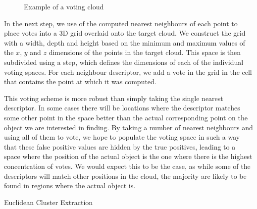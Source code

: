 \documentclass[11pt,a4paper]{kth-mag}
\begin{document}
\begin{figure}
  \centering
  
  \caption{Example of a voting cloud}
  \label{fig:voting}
\end{figure}
In the next step, we use of the computed nearest neighbours of each point to
place votes into a 3D grid overlaid onto the target cloud. We construct the grid
with a width, depth and height based on the minimum and maximum values of the
$x$, $y$ and $z$ dimensions of the points in the target cloud. This space is
then subdivided using a step, which defines the dimensions of each of the
individual voting spaces. For each neighbour descriptor, we add a vote in the
grid in the cell that contains the point at which it was computed.

This voting scheme is more robust than simply taking the single nearest
descriptor. In some cases there will be locations where the descriptor matches
some other point in the space better than the actual corresponding point on the
object we are interested in finding. By taking a number of nearest neighbours
and using all of them to vote, we hope to populate the voting space in such a
way that these false positive values are hidden by the true positives, leading
to a space where the position of the actual object is the one where there is the
highest concentration of votes. We would expect this to be the case, as while
some of the descriptors will match other positions in the cloud, the majority
are likely to be found in regions where the actual object is.


\begin{algorithm}
  \DontPrintSemicolon
  \caption{Euclidean Cluster Extraction \cite{RusuDoctoralDissertation}}
  \label{alg:euc}
\end{algorithm}
\end{document}
